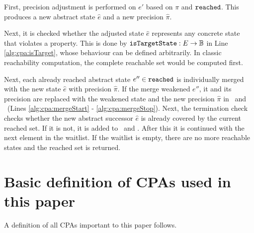 First, precision adjustment is performed on $e'$ based on $\pi$ and $\texttt{reached}$. This produces a new abstract state $\hat{e}$ and a new precision $\hat{\pi}$.

Next, it is checked whether the adjusted state $\hat{e}$ represents any concrete state that violates a property. This is done by $\texttt{isTargetState} : E \rightarrow \mathbb{B}$ in Line \ref{alg:cpa:isTarget}, whose behaviour can be defined arbitrarily.
In classic reachability computation, the complete reachable set would be computed first.

Next, each already reached abstract state $e'' \in \texttt{reached}$ is individually merged with the new state $\hat{e}$ with precision $\hat{\pi}$. If the merge weakened $e''$, it and its precision are replaced with the weakened state and the new precision $\hat{\pi}$ in \reachedSet\ and \waitlistSet\ (Lines \ref{alg:cpa:mergeStart} - \ref{alg:cpa:mergeStop}).
Next, the termination check checks whether the new abstract successor $\hat{e}$ is already covered by the current reached set.
If it is not, it is added to \waitlistSet\ and \reachedSet.
After this it is continued with the next element in the waitlist.
If the waitlist is empty, there are no more reachable states and the reached set is returned.

\section{Basic definition of CPAs used in this paper}
A definition of all CPAs important to this paper follows.

